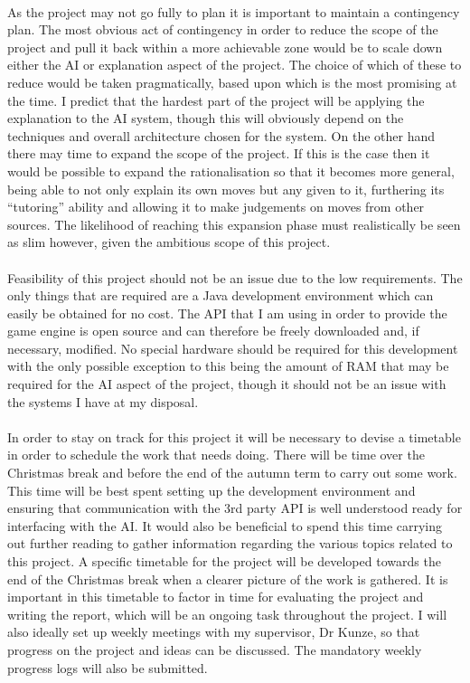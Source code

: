 \documentclass[]{article}
\begin{document}
\paragraph{}
As the project may not go fully to plan it is important to maintain a contingency plan. The most obvious act of contingency in order to reduce the scope of the project and pull it back within a more achievable zone would be to scale down either the AI or explanation aspect of the project. The choice of which of these to reduce would be taken pragmatically, based upon which is the most promising at the time. I predict that the hardest part of the project will be applying the explanation to the AI system, though this will obviously depend on the techniques and overall architecture chosen for the system. On the other hand there may time to expand the scope of the project. If this is the case then it would be possible to expand the rationalisation so that it becomes more general, being able to not only explain its own moves but any given to it, furthering its ``tutoring'' ability and allowing it to make judgements on moves from other sources. The likelihood of reaching this expansion phase must realistically be seen as slim however, given the ambitious scope of this project.

\paragraph{}
Feasibility of this project should not be an issue due to the low requirements. The only things that are required are a Java development environment which can easily be obtained for no cost. The API that I am using in order to provide the game engine is open source and can therefore be freely downloaded and, if necessary, modified. No special hardware should be required for this development with the only possible exception to this being the amount of RAM that may be required for the AI aspect of the project, though it should not be an issue with the systems I have at my disposal.

\paragraph{}
In order to stay on track for this project it will be necessary to devise a timetable in order to schedule the work that needs doing. There will be time over the Christmas break and before the end of the autumn term to carry out some work. This time will be best spent setting up the development environment and ensuring that communication with the 3rd party API is well understood ready for interfacing with the AI. It would also be beneficial to spend this time carrying out further reading to gather information regarding the various topics related to this project. A specific timetable for the project will be developed towards the end of the Christmas break when a clearer picture of the work is gathered. It is important in this timetable to factor in time for evaluating the project and writing the report, which will be an ongoing task throughout the project. I will also ideally set up weekly meetings with my supervisor, Dr Kunze, so that progress on the project and ideas can be discussed. The mandatory weekly progress logs will also be submitted.
\end{document}
